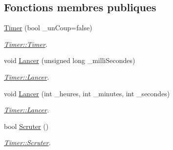 \subsection*{Fonctions membres publiques}
\begin{DoxyCompactItemize}
\item 
\hyperlink{class_timer_a7bbdf7d44a20493674484af45b8f8a98}{Timer} (bool \+\_\+un\+Coup=false)
\begin{DoxyCompactList}\small\item\em \hyperlink{class_timer_a7bbdf7d44a20493674484af45b8f8a98}{Timer\+::\+Timer}. \end{DoxyCompactList}\item 
void \hyperlink{class_timer_a9a30698d13e0369d35307de5d156330f}{Lancer} (unsigned long \+\_\+milli\+Secondes)
\begin{DoxyCompactList}\small\item\em \hyperlink{class_timer_a9a30698d13e0369d35307de5d156330f}{Timer\+::\+Lancer}. \end{DoxyCompactList}\item 
void \hyperlink{class_timer_a17e620ab8d93dd449191b3ced782b153}{Lancer} (int \+\_\+heures, int \+\_\+minutes, int \+\_\+secondes)
\begin{DoxyCompactList}\small\item\em \hyperlink{class_timer_a9a30698d13e0369d35307de5d156330f}{Timer\+::\+Lancer}. \end{DoxyCompactList}\item 
bool \hyperlink{class_timer_aa26129870e5b0a3b2623b70b1412ad7e}{Scruter} ()
\begin{DoxyCompactList}\small\item\em \hyperlink{class_timer_aa26129870e5b0a3b2623b70b1412ad7e}{Timer\+::\+Scruter}. \end{DoxyCompactList}\end{DoxyCompactItemize}
